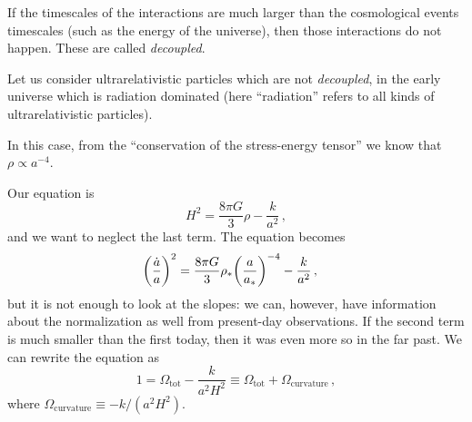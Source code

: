 \documentclass[main.tex]{subfiles}
\begin{document}






If the timescales of the interactions are much larger than the cosmological events timescales (such as the energy of the universe), then those interactions do not happen.
These are called \emph{decoupled}.

Let us consider ultrarelativistic particles which are not \emph{decoupled}, in the early universe which is radiation dominated (here ``radiation'' refers to all kinds of ultrarelativistic particles). 

In this case, from the ``conservation of the stress-energy tensor'' we know that \(\rho \propto a^{-4}\).

Our equation is 
%
\begin{equation}
  H^2= \frac{8 \pi G}{3} \rho - \frac{k}{a^2}
\,,
\end{equation}
%
and we want to neglect the last term. The equation becomes 
%
\begin{subequations}
\begin{align}
  \qty(\frac{\dot{a} }{a})^2 &= \frac{8 \pi G }{3} \rho_{*} \qty(\frac{a}{a_{*}})^{-4} - \frac{k}{a^2} 
\,,
\end{align}
\end{subequations}
%
but it is not enough to look at the slopes: we can, however, have information about the normalization as well from present-day observations.
If the second term is much smaller than the first today, then it was even more so in the far past. We can rewrite the equation as
%
\begin{equation}
  1 = \Omega_{\text{tot}} - \frac{k}{a^2 H^2} \equiv \Omega _{\text{tot}} + \Omega_{\text{curvature}}
\,,
\end{equation}
%
where \(\Omega _{\text{curvature}} \equiv -k / (a^2 H^2)\).
\end{document}
